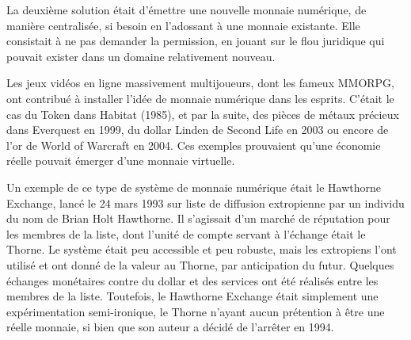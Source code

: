 

La deuxième solution était d'émettre une nouvelle monnaie numérique, de manière centralisée, si besoin en l'adossant à une monnaie existante. Elle consistait à ne pas demander la permission, en jouant sur le flou juridique qui pouvait exister dans un domaine relativement nouveau.

Les jeux vidéos en ligne massivement multijoueurs, dont les fameux MMORPG, ont contribué à installer l'idée de monnaie numérique dans les esprits. C'était le cas du Token dans Habitat (1985), et par la suite, des pièces de métaux précieux dans Everquest en 1999, du dollar Linden de Second Life en 2003 ou encore de l'or de World of Warcraft en 2004. Ces exemples prouvaient qu'une économie réelle pouvait émerger d'une monnaie virtuelle.

Un exemple de ce type de système de monnaie numérique était le Hawthorne Exchange, lancé le 24 mars 1993 sur liste de diffusion extropienne par un individu du nom de Brian Holt Hawthorne. Il s'agissait d'un marché de réputation pour les membres de la liste, dont l'unité de compte servant à l'échange était le Thorne. Le système était peu accessible et peu robuste, mais les extropiens l'ont utilisé et ont donné de la valeur au Thorne, par anticipation du futur. Quelques échanges monétaires contre du dollar et des services ont été réalisés entre les membres de la liste. Toutefois, le Hawthorne Exchange était simplement une expérimentation semi-ironique, le Thorne n'ayant aucun prétention à être une réelle monnaie, si bien que son auteur a décidé de l'arrêter en 1994.

